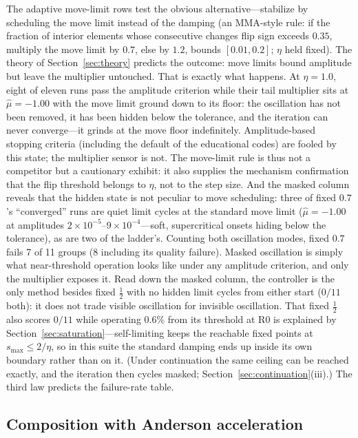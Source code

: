 \documentclass[11pt,a4paper]{article}
\newcommand{\smax}{s_{\max}}
\newcommand{\muh}{\hat{\mu}}
\begin{document}
The adaptive move-limit rows test the obvious alternative---stabilize by
scheduling the move limit instead of the damping (an MMA-style rule: if
the fraction of interior elements whose consecutive changes flip sign
exceeds $0.35$, multiply the move limit by $0.7$, else by $1.2$, bounds
$[0.01,0.2]$; $\eta$ held fixed). The theory of
Section~\ref{sec:theory} predicts the outcome: move limits bound
amplitude but leave the multiplier untouched. That is exactly what
happens. At $\eta=1.0$, eight of eleven runs pass the amplitude
criterion while their tail multiplier sits at $\muh=-1.00$ with the move
limit ground down to its floor: the oscillation has not been removed, it
has been hidden below the tolerance, and the iteration can never
converge---it grinds at the move floor indefinitely. Amplitude-based
stopping criteria (including the default of the educational codes) are
fooled by this state; the multiplier sensor is not. The move-limit rule
is thus not a competitor but a cautionary exhibit: it also supplies the
mechanism confirmation that the flip threshold belongs to $\eta$, not to
the step size. And the masked column reveals that the hidden state is
not peculiar to move scheduling: three of fixed $0.7$'s ``converged''
runs are quiet limit cycles at the standard move limit ($\muh=-1.00$ at
amplitudes $2\times10^{-5}$--$9\times10^{-4}$---soft, supercritical
onsets hiding below the tolerance), as are two of the ladder's.
Counting both oscillation modes, fixed $0.7$ fails 7 of 11 groups (8
including its quality failure). Masked oscillation is simply what
near-threshold operation looks like under any amplitude criterion, and
only the multiplier exposes it. Read down the masked column, the
controller is the only method besides fixed $\tfrac12$ with no hidden
limit cycles from either start ($0/11$ both): it does not trade visible
oscillation for invisible oscillation. That fixed $\tfrac12$ also
scores $0/11$ while operating $0.6\%$ from its threshold at R0 is
explained by Section~\ref{sec:saturation}---self-limiting keeps the
reachable fixed points at $\smax\le2/\eta$, so in this suite the
standard damping ends up inside its own boundary rather than on it.
(Under continuation the same ceiling can be reached exactly, and the
iteration then cycles masked; Section~\ref{sec:continuation}(iii).) The third law
predicts the failure-rate table.

\subsection{Composition with Anderson acceleration}\label{sec:anderson}
\end{document}
